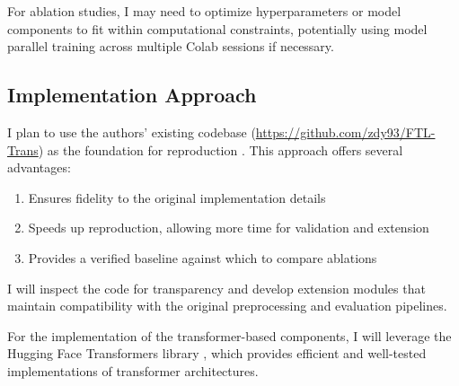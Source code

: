 \documentclass[10pt,letterpaper,twocolumn]{article}
\begin{document}
For ablation studies, I may need to optimize hyperparameters or model components to fit within computational constraints, potentially using model parallel training across multiple Colab sessions if necessary.

\subsection{Implementation Approach}

I plan to use the authors' existing codebase (\url{https://github.com/zdy93/FTL-Trans}) as the foundation for reproduction \cite{zhang2020time}. This approach offers several advantages:

\begin{enumerate}[leftmargin=*]
    \item Ensures fidelity to the original implementation details
    \item Speeds up reproduction, allowing more time for validation and extension
    \item Provides a verified baseline against which to compare ablations
\end{enumerate}

I will inspect the code for transparency and develop extension modules that maintain compatibility with the original preprocessing and evaluation pipelines.

For the implementation of the transformer-based components, I will leverage the Hugging Face Transformers library \cite{wolf2019huggingface}, which provides efficient and well-tested implementations of transformer architectures.



\end{document}
